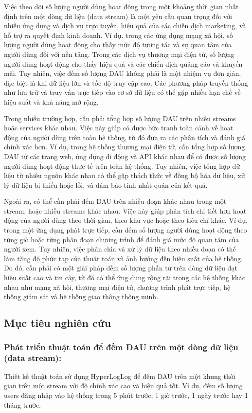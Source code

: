 \documentclass[a4paper,11pt]{article}
\theoremstyle{mytheor}
\begin{document}
Việc theo dõi số lượng người dùng hoạt động trong một khoảng thời gian nhất định trên một dòng dữ liệu (data stream) 
là một yêu cầu quan trọng đối với nhiều ứng dụng và dịch vụ trực tuyến, hiệu quả của các chiến dịch marketing, 
và hỗ trợ ra quyết định kinh doanh. Ví dụ, trong các ứng dụng mạng xã hội, số lượng người dùng hoạt động cho thấy mức độ tương tác 
và sự quan tâm của người dùng đối với nền tảng. Trong các dịch vụ thương mại điện tử, số lượng người dùng hoạt động cho thấy hiệu quả 
và các chiến dịch quảng cáo và khuyến mãi. Tuy nhiên, việc đếm số lượng DAU không phải là một nhiệm vụ đơn giản, đặc biệt là khi dữ liệu lớn 
và tốc độ truy cập cao. Các phương pháp truyền thống như lưu trữ và truy vấn trực tiếp vào cơ sở dữ liệu có thể gặp nhiều hạn chế về hiệu suất 
và khả năng mở rộng.

Trong nhiều trường hợp, cần phải tổng hợp số lượng DAU trên nhiều streams hoặc services khác nhau. Việc này giúp có được bức tranh toàn cảnh về hoạt động của người dùng trên toàn hệ thống, từ đó đưa ra các phân tích và đánh giá chính xác hơn. Ví dụ, trong hệ thống thương mại điện tử, cần tổng hợp số lượng DAU từ các trang web, ứng dụng di động và API khác nhau để có được số lượng người dùng hoạt động thực tế trên toàn hệ thống. Tuy nhiên, việc tổng hợp dữ liệu từ nhiều nguồn khác nhau có thể gặp thách thức về đồng bộ hóa dữ liệu, xử lý dữ liệu bị thiếu hoặc lỗi, và đảm bảo tính nhất quán của kết quả. 

Ngoài ra, có thể cần phải đếm DAU trên nhiều đoạn khác nhau trong một stream, hoặc nhiều streams khác nhau. Việc này giúp phân tích chi tiết hơn hoạt động của người dùng theo thời gian, theo khu vực hoặc theo tiêu chí khác. Ví dụ, trong một ứng dụng phát trực tiếp, cần đếm số lượng người dùng hoạt động theo từng giờ hoặc từng phân đoạn chương trình để đánh giá mức độ quan tâm của người xem. Tuy nhiên, việc phân chia và xử lý dữ liệu theo nhiều đoạn có thể làm tăng độ phức tạp của thuật toán và ảnh hưởng đến hiệu suất của hệ thống. Do đó, cần phải có một giải pháp đếm số lượng phần tử trên dòng dữ liệu đạt hiệu suất cao và tin cậy, từ đó có thể ứng dụng rộng rãi trong các hệ thống khác nhau như mạng xã hội, thương mại điện tử, chương trình phát trực tiếp, hệ thống giám sát và hệ thống giao thông thông minh.

\subsection{Mục tiêu nghiên cứu }
\subsubsection{Phát triển thuật toán để đếm DAU trên một dòng dữ liệu (data stream):}
Thiết kế thuật toán sử dụng HyperLogLog để đếm DAU trên một khung thời gian trên một stream với độ chính xác cao và hiệu quả tốt. Ví dụ, đếm số lượng users đăng nhập vào hệ thống trong 5 phút trước, 1 giờ trước, 1 ngày trước hay 1 tháng trước.
\end{document}
